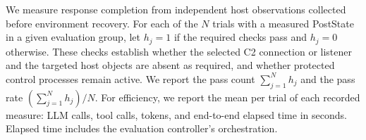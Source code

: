 \documentclass[pdflatex,sn-basic]{sn-jnl}
\newcommand{\system}{\textsc{C2Trace}\xspace}
\begin{document}
We measure response completion from independent host observations collected before environment recovery. For each of the $N$ trials with a measured PostState in a given evaluation group, let $h_j=1$ if the required checks pass and $h_j=0$ otherwise. These checks establish whether the selected C2 connection or listener and the targeted host objects are absent as required, and whether protected control processes remain active. We report the pass count $\sum_{j=1}^{N}h_j$ and the pass rate $(\sum_{j=1}^{N}h_j)/N$. For efficiency, we report the mean per trial of each recorded measure: LLM calls, tool calls, tokens, and end-to-end elapsed time in seconds. Elapsed time includes the evaluation controller's orchestration.



\end{document}
